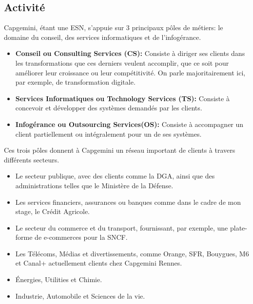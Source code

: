 \documentclass{rapport}
\begin{document}
\subsection{Activité}

Capgemini, étant une ESN, s'appuie sur 3 principaux pôles de métiers: le domaine du conseil, des services informatiques et de l'infogérance.
\begin{itemize}
  \item \textbf{Conseil ou Consulting Services (CS):} Consiste à diriger ses clients dans les transformations que ces derniers veulent accomplir, que ce soit pour améliorer leur croissance ou leur compétitivité. On parle majoritairement ici, par exemple, de transformation digitale.
  
  \item \textbf{Services Informatiques ou Technology Services (TS):} Consiste à concevoir et développer des systèmes demandés par les clients.
  
  \item \textbf{Infogérance ou Outsourcing Services(OS):} Consiste à accompagner un client partiellement ou intégralement pour un de ses systèmes. 
\end{itemize}
\vspace{5mm}
Ces trois pôles donnent à Capgemini un réseau important de clients à travers différents secteurs.

\begin{itemize}
  \item Le secteur publique, avec des clients comme la DGA, ainsi que des administrations telles que le Ministère de la Défense.
  
  \item Les services financiers, assurances ou banques comme dans le cadre de mon stage, le Crédit Agricole.
  
  \item Le secteur du commerce et du transport, fournissant, par exemple, une plate-forme de e-commerces pour la SNCF.
  
  \item Les Télécoms, Médias et divertissements, comme  Orange, SFR, Bouygues, M6 et Canal+ actuellement clients chez Capgemini Rennes.
  
  \item Énergies, Utilities et Chimie.
  
  \item Industrie, Automobile et Sciences de la vie.
\end{itemize}
\end{document}
